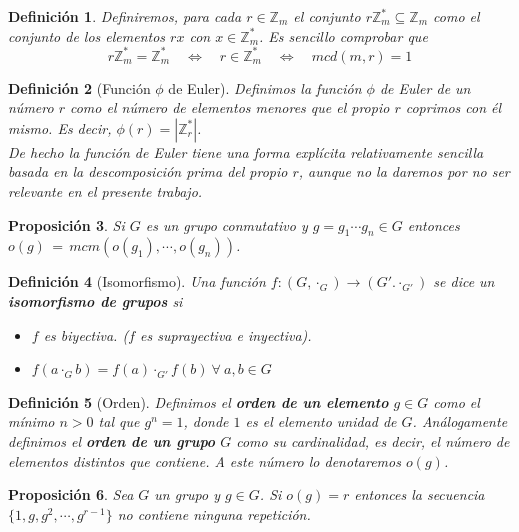 \documentclass[11pt, spanish]{report}
\numberwithin{equation}{section}
\newtheorem{defin}{Definición}[section]
\newtheorem{prop}[defin]{Proposición}
\numberwithin{defin}{section}
\begin{document}
\begin{appendices}
\begin{defin}
Definiremos, para cada $r\in\mathbb{Z}_m$ el conjunto $r\mathbb{Z}_m^*\subseteq\mathbb{Z}_m $ como el conjunto de los elementos $rx$ con $x\in\mathbb{Z}_m^*$. Es sencillo comprobar que 
\begin{equation}
r\mathbb{Z}_m^*=\mathbb{Z}_m^*\quad \Leftrightarrow \quad r\in\mathbb{Z}_m^* \quad \Leftrightarrow \quad mcd(m,r)=1
\end{equation}

\end{defin}

\begin{defin}[Función $\phi$ de Euler]\label{Euler}
Definimos la función $\phi$ de Euler de un número $r$ como el número de elementos menores que el propio $r$ coprimos con él mismo. Es decir, $\phi(r)=|\mathbb{Z}_r^*|$.\\

De hecho la función de Euler tiene una forma explícita relativamente sencilla basada en la descomposición prima del propio $r$, aunque no la daremos por no ser relevante en el presente trabajo. 
\end{defin}

\begin{prop}\label{otromas} Si $G$ es un grupo conmutativo y $g=g_1\cdots g_n\in G$ entonces $o(g)\, =\, mcm(o(g_1),\cdots,o(g_n))$.
\end{prop}

\begin{defin}[Isomorfismo]  Una función $f:(G,\cdot_G)\rightarrow(G'.\cdot_{G'})$ se dice un \textbf{isomorfismo de grupos} si
\begin{itemize}
\item $f$ es biyectiva. ($f$ es suprayectiva e inyectiva).
\item $f(a\cdot_Gb)=f(a)\cdot_{G'}f(b)\ \forall\ a,b\in G $
\end{itemize}

\end{defin}

\begin{defin}[Orden] 
Definimos el \textbf{orden de un elemento} $g\in G$ como el mínimo $n>0$ tal que $g^n=1$, donde $1$ es el elemento unidad de $G$. Análogamente definimos el \textbf{orden de un grupo} $G$ como su cardinalidad, es decir, el número de elementos distintos que contiene. A este número lo denotaremos $o(g)$.
\end{defin}

\begin{prop} \label{otroTeoremaNumeros} Sea $G$ un grupo y $g\in G$. Si $o(g)=r$ entonces la secuencia $\{1,g,g^2,\cdots,g^{r-1}\}$ no contiene ninguna repetición.
\end{prop}


\end{appendices}
\end{document}
